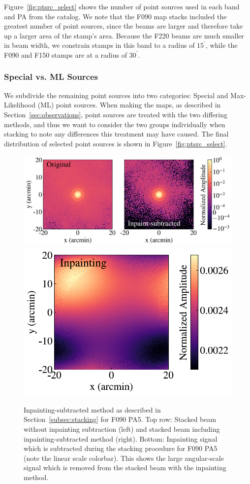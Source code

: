 Figure~\ref{fig:ptsrc_select} shows the number of point sources used in each band and PA from the catalog.  We note that the F090 map stacks included the greatest number of point sources, since the beams are larger and therefore take up a larger area of the stamp's area.  Because the F220 beams are much smaller in beam width, we constrain stamps in this band to a radius of $15^{\prime}$, while the F090 and F150 stamps are at a radius of $30^{\prime}$.

\subsubsection{Special vs. ML Sources}
\label{subsubsec:type_sel}
We subdivide the remaining point sources into two categories: Special and Max-Likelihood (ML) point sources.  When making the maps, as described in Section~\ref{sec:observations}, point sources are treated with the two differing methods, and thus we want to consider the two groups individually when stacking to note any differences this treatment may have caused.  The final distribution of selected point sources is shown in Figure~\ref{fig:ptsrc_select}.

\begin{figure}[t]
    \centering
    \includegraphics[height=.35\textwidth]{Figures/inpaint1.pdf}
    \includegraphics[height=.35\textwidth]{Figures/inpaint2.pdf}
    \caption{Inpainting-subtracted method as described in Section~\ref{subsec:stacking} for F090 PA5.  Top row: Stacked beam without inpainting subtraction (left) and stacked beam including inpainting-subtracted method (right).  Bottom: Inpainting signal which is subtracted during the stacking procedure for F090 PA5 (note the linear scale colorbar).  This shows the large angular-scale signal which is removed from the stacked beam with the inpainting method.}
    \label{fig:example_maps}
    \vspace{1em}
\end{figure}


